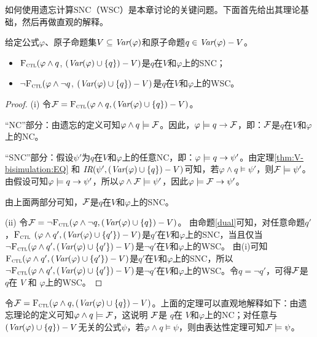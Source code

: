 如何使用遗忘计算SNC（WSC）是本章讨论的关键问题。下面首先给出其理论基础，然后再做直观的解释。


\begin{theorem}\label{thm:SNC:WSC:forget}
	给定公式$\varphi$、原子命题集$V\subseteq\textit{Var}(\varphi)$和原子命题$q\in\textit{Var}(\varphi)- V$。
	\begin{itemize}
		\item[(i)] ${\textsc{F}_{\textsc{ctl}}} (\varphi \land q$, $(\textit{Var}(\varphi) \cup \{q\}) - V)$是$q$在$V$和$\varphi$上的SNC；
		\item[(ii)]  $\neg{\textsc{F}_{\textsc{ctl}}} (\varphi \land \neg q$, $(\textit{Var}(\varphi) \cup \{q\}) - V)$是$q$在$V$和$\varphi$上的WSC。
	\end{itemize}
\end{theorem}
\begin{proof}
	(i) 令${\cal F}={\textsc{F}_{\textsc{ctl}}}(\varphi \wedge q, (\textit{Var}(\varphi) \cup \{q\})- V)$。
	
	
	“NC”部分：由遗忘的定义可知$\varphi \wedge q \models {\cal F}$。因此，$\varphi\models q \rightarrow {\cal F}$，即：${\cal F}$是$q$在$V$和$\varphi$ 上的NC。
	
	“SNC”部分：假设$\psi'$为$q$在$V$和$\varphi$上的任意NC，即：$\varphi\models q \rightarrow \psi'$。由定理\ref{thm:V-bisimulation:EQ} 和 $\emph{IR}(\psi', (\textit{Var}(\varphi) \cup \{q\})- V)$可知，若$\varphi \wedge q \models \psi'$，则${\cal F} \models \psi'$。
	由假设可知$\varphi\models q \rightarrow \psi'$，所以$\varphi \wedge {\cal F} \models \psi'$，因此$\varphi \models {\cal F} \rightarrow \psi'$。
	
	由上面两部分可知，${\cal F}$是$q$在$V$和$\varphi$上的SNC。
	
	(ii) 令${\cal F}=\neg {\textsc{F}_{\textsc{ctl}}}(\varphi \wedge \neg q, (\textit{Var}(\varphi) \cup \{q\})- V)$。
	由命题\ref{dual}可知，对任意命题$q'$，${\textsc{F}_{\textsc{ctl}}}$ $(\varphi \wedge q', (\textit{Var}(\varphi) \cup \{q'\})- V)$是$q'$在$V$和$\varphi$上的SNC，当且仅当
	$\neg {\textsc{F}_{\textsc{ctl}}}(\varphi \wedge q', (\textit{Var}(\varphi) \cup \{q'\})- V)$是$\neg q'$在$V$和$\varphi$上的WSC。
	由(i)可知${\textsc{F}_{\textsc{ctl}}}(\varphi \wedge q', (\textit{Var}(\varphi) \cup \{q'\})- V)$是$q'$在$V$和$\varphi$上的SNC，所以$\neg {\textsc{F}_{\textsc{ctl}}}(\varphi \wedge q', (\textit{Var}(\varphi) \cup \{q'\})- V)$是$\neg q'$在$V$和$\varphi$上的WSC。令$q=\neg q'$，可得${\cal F}$是 $q$在 $V$ 和 $\varphi$上的WSC。
\end{proof}

令${\cal F}={\textsc{F}_{\textsc{ctl}}}(\varphi \wedge q, (\textit{Var}(\varphi) \cup \{q\})- V)$。上面的定理可以直观地解释如下：由遗忘理论的定义可知$\varphi \wedge q \models {\cal F}$，这说明
${\cal F}$是 $q$在 $V$和$\varphi$上的NC；对任意与$(\textit{Var}(\varphi) \cup \{q\})- V$无关的公式$\psi$，若$\varphi \wedge q \models \psi$，则由表达性定理可知${\cal F} \models \psi$。

